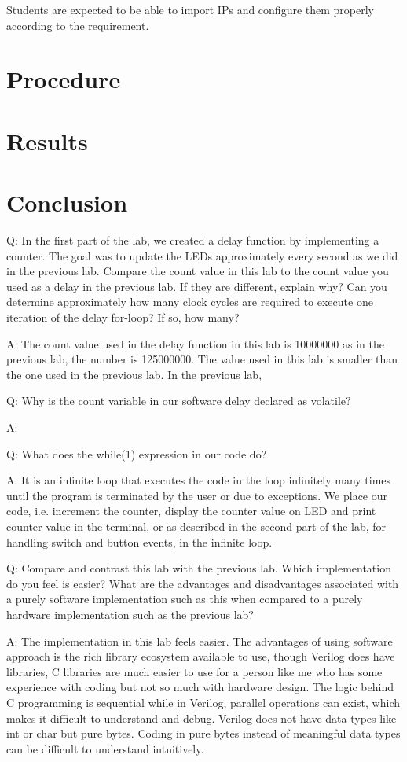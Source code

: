\documentclass[11pt,letterpaper,titlepage]{article}
\begin{document}
Students are expected to be able to import IPs and configure them properly according to the requirement.

\section{Procedure}

\section{Results}

\section{Conclusion}

Q: In the first part of the lab, we created a delay function by implementing a counter. The goal was to update the LEDs approximately every second as we did in the previous lab. Compare the count value in this lab to the count value you used as a delay in the previous lab. If they are different, explain why? Can you determine approximately how many clock cycles are required to execute one iteration of the delay for-loop? If so, how many?

A: The count value used in the delay function in this lab is 10000000 as in the previous lab, the number is 125000000. The value used in this lab is smaller than the one used in the previous lab. In the previous lab, 

Q: Why is the count variable in our software delay declared as volatile?

A:

Q: What does the while(1) expression in our code do?

A: It is an infinite loop that executes the code in the loop infinitely many times until the program is terminated by the user or due to exceptions. We place our code, i.e. increment the counter, display the counter value on LED and print counter value in the terminal, or as described in the second part of the lab, for handling switch and button events, in the infinite loop.

Q: Compare and contrast this lab with the previous lab. Which implementation do you feel is easier? What are the advantages and disadvantages associated with a purely software implementation such as this when compared to a purely hardware implementation such as the previous lab?

A: The implementation in this lab feels easier. The advantages of using software approach is the rich library ecosystem available to use, though Verilog does have libraries, C libraries are much easier to use for a person like me who has some experience with coding but not so much with hardware design. The logic behind C programming is sequential while in Verilog, parallel operations can exist, which makes it difficult to understand and debug. Verilog does not have data types like int or char but pure bytes. Coding in pure bytes instead of meaningful data types can be difficult to understand intuitively.
\end{document}
